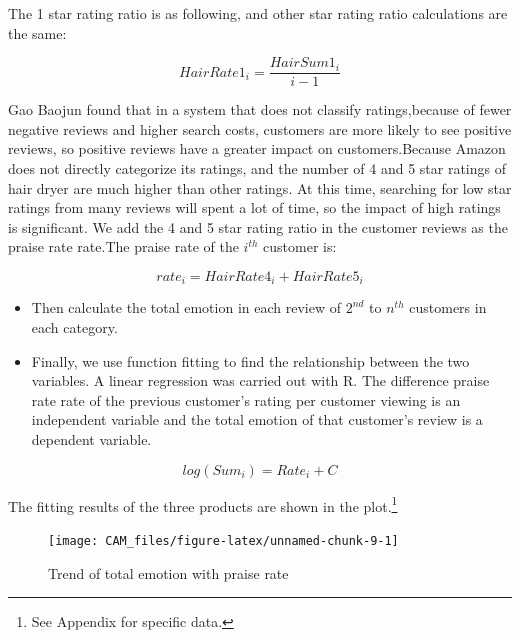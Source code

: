 \documentclass[12pt,a4paper,]{article}
\let\rmarkdownfootnote\footnote%
\def\footnote{\protect\rmarkdownfootnote}
\begin{document}
The 1 star rating ratio is as following, and other star rating ratio
calculations are the same:

\begin{equation}
HairRate1_{i}=\frac{HairSum1_{i}}{i-1}
\end{equation}

Gao Baojun found that in a system that does not classify ratings,because
of fewer negative reviews and higher search costs, customers are more
likely to see positive reviews, so positive reviews have a greater
impact on customers.Because Amazon does not directly categorize its
ratings, and the number of 4 and 5 star ratings of hair dryer are much
higher than other ratings. At this time, searching for low star ratings
from many reviews will spent a lot of time, so the impact of high
ratings is significant. We add the 4 and 5 star rating ratio in the
customer reviews as the praise rate rate.The praise rate of the
\(i^{th}\) customer is:

\begin{equation}
rate_{i}=HairRate4_{i}+HairRate5_{i}
\end{equation}

\begin{itemize}
\item
  Then calculate the total emotion in each review of \(2^{nd}\) to
  \(n^{th}\) customers in each category.
\item
  Finally, we use function fitting to find the relationship between the
  two variables. A linear regression was carried out with R. The
  difference praise rate rate of the previous customer's rating per
  customer viewing is an independent variable and the total emotion of
  that customer's review is a dependent variable.
\end{itemize}

\begin{equation}
log(Sum_{i})=Rate_{i}+C
\end{equation}

The fitting results of the three products are shown in the
plot.\footnote{See Appendix for specific data.}

\begin{figure}

{\centering \texttt{[image: CAM\_files/figure-latex/unnamed-chunk-9-1]} 

}

\caption{Trend of total emotion with praise rate}\label{fig:unnamed-chunk-9}
\end{figure}
\end{document}

